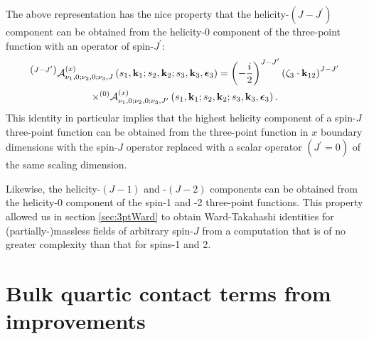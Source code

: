 \documentclass[11pt,a4paper]{article}
\begin{document}
The above representation has the nice property that the helicity-$\left(J-J^\prime\right)$ component can be obtained from the helicity-$0$ component of the three-point function with an operator of spin-$J^\prime$:
\begin{multline}
     {}^{\left(J-J^\prime\right)}{\cal A}^{\left(x\right)}_{\nu_1,0;\nu_2,0;\nu_3,J}\left(s_1,{\bf k}_1;s_2,{\bf k}_2;s_3,{\bf k}_3,\boldsymbol{\epsilon}_3\right)= \left(-\frac{i}{2}\right)^{J-J^\prime} \left(\zeta_3 \cdot {\bf k}_{12}\right)^{J-J^\prime}\\ \times {}^{\left(0\right)}{\cal A}^{\left(x\right)}_{\nu_1,0;\nu_2,0;\nu_3,J^\prime}\left(s_1,{\bf k}_1;s_2,{\bf k}_2;s_3,{\bf k}_3,\boldsymbol{\epsilon}_3\right).
\end{multline}
This identity in particular implies that the highest helicity component of a spin-$J$ three-point function can be obtained from the three-point function in $x$ boundary dimensions with the spin-$J$ operator replaced with a scalar operator $\left(J^{\prime}=0\right)$ of the same scaling dimension.

Likewise, the helicity-$\left(J-1\right)$ and -$\left(J-2\right)$ components can be obtained from the helicity-$0$ component of the spin-1 and -2 three-point functions. This property allowed us in section \ref{sec:3ptWard} to obtain Ward-Takahashi identities for (partially-)massless fields of arbitrary spin-$J$ from a computation that is of no greater complexity than that for spins-1 and 2.


\section{Bulk quartic contact terms from improvements}\label{App:U_int}
\end{document}
